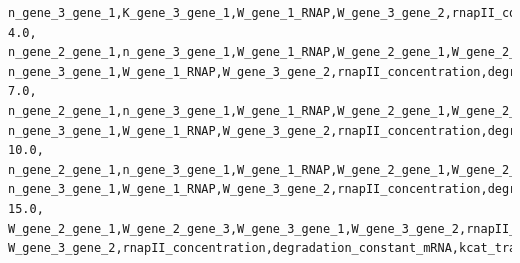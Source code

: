 \documentclass{article}
\begin{document}
\begin{landscape}
{\begin{verbatim}
n_gene_3_gene_1,K_gene_3_gene_1,W_gene_1_RNAP,W_gene_3_gene_2,rnapII_concentration,degradation_constant_mRNA,kcat_translation,maximum_specific_growth_rate
4.0,
n_gene_2_gene_1,n_gene_3_gene_1,W_gene_1_RNAP,W_gene_2_gene_1,W_gene_2_gene_3,W_gene_3_gene_1,W_gene_3_gene_2,rnapII_concentration,ribosome_concentration,degradation_constant_mRNA,kcat_transcription,kcat_translation,maximum_specific_growth_rate
n_gene_3_gene_1,W_gene_1_RNAP,W_gene_3_gene_2,rnapII_concentration,degradation_constant_mRNA,kcat_translation,maximum_specific_growth_rate
7.0,
n_gene_2_gene_1,n_gene_3_gene_1,W_gene_1_RNAP,W_gene_2_gene_1,W_gene_2_gene_3,W_gene_3_gene_1,W_gene_3_gene_2,rnapII_concentration,ribosome_concentration,degradation_constant_mRNA,kcat_translation,maximum_specific_growth_rate
n_gene_3_gene_1,W_gene_1_RNAP,W_gene_3_gene_2,rnapII_concentration,degradation_constant_mRNA,kcat_translation
10.0,
n_gene_2_gene_1,n_gene_3_gene_1,W_gene_1_RNAP,W_gene_2_gene_1,W_gene_2_gene_3,W_gene_3_gene_1,W_gene_3_gene_2,rnapII_concentration,degradation_constant_mRNA,kcat_translation,maximum_specific_growth_rate
n_gene_3_gene_1,W_gene_1_RNAP,W_gene_3_gene_2,rnapII_concentration,degradation_constant_mRNA,kcat_translation
15.0,
W_gene_2_gene_1,W_gene_2_gene_3,W_gene_3_gene_1,W_gene_3_gene_2,rnapII_concentration,degradation_constant_mRNA,kcat_translation,maximum_specific_growth_rate,saturation_constant_translation
W_gene_3_gene_2,rnapII_concentration,degradation_constant_mRNA,kcat_translation,maximum_specific_growth_rate

\end{verbatim}}
\end{landscape}
\end{document}
